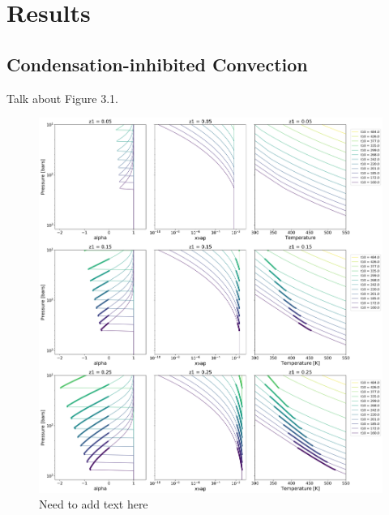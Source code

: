 \documentclass[11pt]{ucscthesisbs}
\begin{document}
\chapter{Results}

\section{Condensation-inhibited Convection}
Talk about Figure 3.1.
\begin{figure}[ht!]
 \centerline{
  \includegraphics[width=7.0in]{figures/convection_inhibited_2.png}
 }
\caption[Inhibition of convection on Uranus]
{Need to add text here}
\label{fig:uranus}
\end{figure}
\end{document}
